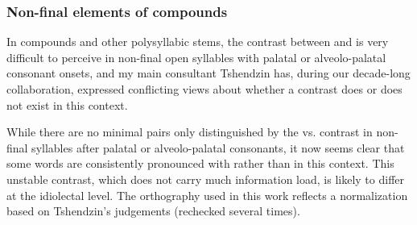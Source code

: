 \subsubsection{Non-final elements of compounds} \label{sec:W.i.compounds}
In compounds and other polysyllabic stems, the contrast between  and  is very difficult to perceive in non-final open syllables with palatal or alveolo-palatal consonant onsets, and my main consultant Tshendzin has, during our decade-long collaboration, expressed conflicting views about whether a contrast does or does not exist in this context.

While there are no minimal pairs only distinguished by the  vs.  contrast in non-final syllables after palatal or alveolo-palatal consonants, it now seems clear that some words are consistently pronounced with  rather than  in this context. This unstable contrast, which does not carry much information load, is likely to differ at the idiolectal level. The orthography used in this work reflects a normalization based on Tshendzin's judgements (rechecked several times).

